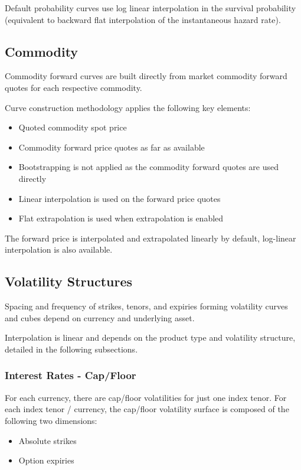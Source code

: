 Default probability curves use log linear interpolation in the survival probability (equivalent to backward flat
interpolation of the instantaneous hazard rate).

\subsection{Commodity}

Commodity forward curves are built directly from market commodity forward quotes 
for each respective commodity.

Curve construction methodology applies the following key elements:
\begin{itemize}
\item Quoted commodity spot price
\item Commodity forward price quotes as far as available 
\item Bootstrapping is not applied as the commodity forward quotes are used directly 
\item Linear interpolation is used on the forward price quotes
\item Flat extrapolation is used when extrapolation is enabled
\end{itemize}

The forward price is interpolated and extrapolated linearly by default, log-linear interpolation is also available.

\subsection{Volatility Structures}

Spacing and frequency of strikes, tenors, and expiries forming volatility curves 
and cubes depend on currency and underlying asset.

Interpolation is linear and depends on the product type and volatility structure, 
detailed in the following subsections.

\subsubsection{Interest Rates - Cap/Floor}

For each currency, there are cap/floor volatilities for just one index tenor. 
For each index tenor / currency, the cap/floor volatility surface is composed of 
the following two dimensions:
\begin{itemize}
\item Absolute strikes
\item Option expiries
\end{itemize}

